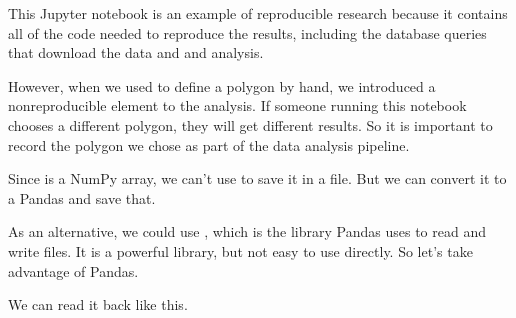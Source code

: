 \documentclass[letterpaper,10pt,english]{sphinxmanual}
\begin{document}
This Jupyter notebook is an example of reproducible research because it contains all of the code needed to reproduce the results, including the database queries that download the data and and analysis.

However, when we used  to define a polygon by hand, we introduced a non\sphinxhyphen{}reproducible element to the analysis.  If someone running this notebook chooses a different polygon, they will get different results.  So it is important to record the polygon we chose as part of the data analysis pipeline.

Since  is a NumPy array, we can’t use  to save it in a file.  But we can convert it to a Pandas  and save that.

As an alternative, we could use , which is the library Pandas uses to read and write files.  It is a powerful library, but not easy to use directly.  So let’s take advantage of Pandas.

\begin{sphinxVerbatim}[commandchars=\\\{\}]
  
\end{sphinxVerbatim}

\begin{sphinxVerbatim}[commandchars=\\\{\}]
  
 
\end{sphinxVerbatim}

We can read it back like this.

\begin{sphinxVerbatim}[commandchars=\\\{\}]
   
  
\end{sphinxVerbatim}
\end{document}
